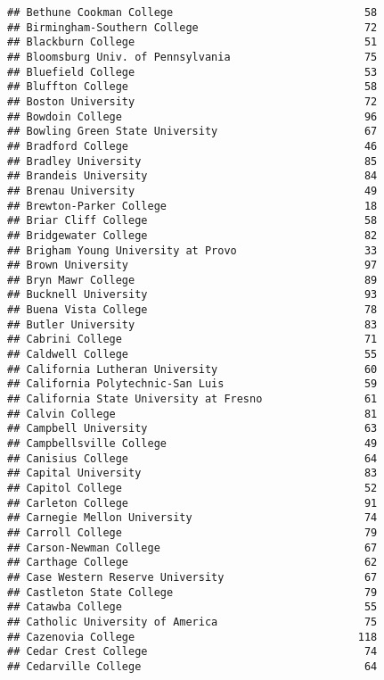 \documentclass[
]{article}
\begin{document}
\begin{verbatim}
## Bethune Cookman College                              58
## Birmingham-Southern College                          72
## Blackburn College                                    51
## Bloomsburg Univ. of Pennsylvania                     75
## Bluefield College                                    53
## Bluffton College                                     58
## Boston University                                    72
## Bowdoin College                                      96
## Bowling Green State University                       67
## Bradford College                                     46
## Bradley University                                   85
## Brandeis University                                  84
## Brenau University                                    49
## Brewton-Parker College                               18
## Briar Cliff College                                  58
## Bridgewater College                                  82
## Brigham Young University at Provo                    33
## Brown University                                     97
## Bryn Mawr College                                    89
## Bucknell University                                  93
## Buena Vista College                                  78
## Butler University                                    83
## Cabrini College                                      71
## Caldwell College                                     55
## California Lutheran University                       60
## California Polytechnic-San Luis                      59
## California State University at Fresno                61
## Calvin College                                       81
## Campbell University                                  63
## Campbellsville College                               49
## Canisius College                                     64
## Capital University                                   83
## Capitol College                                      52
## Carleton College                                     91
## Carnegie Mellon University                           74
## Carroll College                                      79
## Carson-Newman College                                67
## Carthage College                                     62
## Case Western Reserve University                      67
## Castleton State College                              79
## Catawba College                                      55
## Catholic University of America                       75
## Cazenovia College                                   118
## Cedar Crest College                                  74
## Cedarville College                                   64

\end{verbatim}
\end{document}
